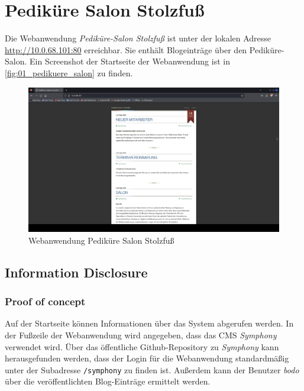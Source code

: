 \chapter{Pediküre Salon Stolzfuß}
Die Webanwendung \textit{Pediküre-Salon Stolzfuß} ist unter der lokalen Adresse \url{http://10.0.68.101:80} erreichbar. Sie enthält Blogeinträge über den Pediküre-Salon. Ein Screenshot der Startseite der Webanwendung ist in \autoref{fig:01_pedikuere_salon} zu finden.

\vfill
\begin{figure}[!ht]
    \centering
    \includegraphics[width=\linewidth]{images/screenshots/03_pedikuere_salon.png}
    \caption{Webanwendung Pediküre Salon Stolzfuß}
    \label{fig:01_pedikuere_salon}
\end{figure}
\vfill
\newpage

\section{\makecvssbadge Information Disclosure}
\subsection*{Proof of concept}
 Auf der Startseite können Informationen über das System abgerufen werden. In der Fußzeile der Webanwendung wird angegeben, dass das CMS \textit{Symphony} verwendet wird. Über das öffentliche Github-Repository zu \textit{Symphony} kann herausgefunden werden, dass der Login für die Webanwendung standardmäßig unter der Subadresse \texttt{/symphony} zu finden ist. Außerdem kann der Benutzer \textit{bodo} über die veröffentlichten Blog-Einträge ermittelt werden. 

